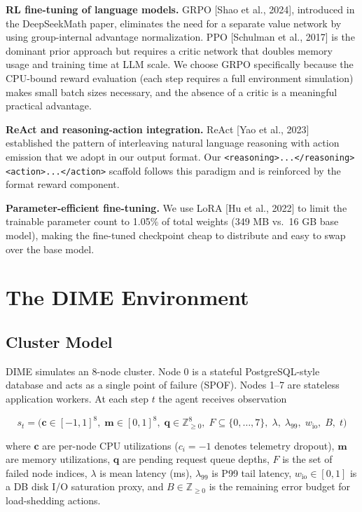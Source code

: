 \documentclass{article}
\begin{document}
\textbf{RL fine-tuning of language models.} GRPO [Shao et al., 2024], introduced in
the DeepSeekMath paper, eliminates the need for a separate value network by using
group-internal advantage normalization. PPO [Schulman et al., 2017] is the dominant
prior approach but requires a critic network that doubles memory usage and training time
at LLM scale. We choose GRPO specifically because the CPU-bound reward evaluation (each
step requires a full environment simulation) makes small batch sizes necessary, and the
absence of a critic is a meaningful practical advantage.

\textbf{ReAct and reasoning-action integration.} ReAct [Yao et al., 2023] established
the pattern of interleaving natural language reasoning with action emission that we adopt
in our output format. Our \texttt{<reasoning>...</reasoning><action>...</action>}
scaffold follows this paradigm and is reinforced by the format reward component.

\textbf{Parameter-efficient fine-tuning.} We use LoRA [Hu et al., 2022] to limit the
trainable parameter count to 1.05\% of total weights (349 MB vs.\ 16 GB base model),
making the fine-tuned checkpoint cheap to distribute and easy to swap over the base
model.

\section{The DIME Environment}

\subsection{Cluster Model}

DIME simulates an 8-node cluster. Node 0 is a stateful PostgreSQL-style database and
acts as a single point of failure (SPOF). Nodes 1--7 are stateless application workers.
At each step $t$ the agent receives observation

\[
s_t = \bigl(\mathbf{c} \in [-1,1]^8,\; \mathbf{m} \in [0,1]^8,\; \mathbf{q} \in \mathbb{Z}_{\geq 0}^8,\; F \subseteq \{0,\ldots,7\},\; \lambda,\; \lambda_{99},\; w_{\mathrm{io}},\; B,\; t\bigr)
\]

where $\mathbf{c}$ are per-node CPU utilizations ($c_i = -1$ denotes telemetry dropout),
$\mathbf{m}$ are memory utilizations, $\mathbf{q}$ are pending request queue depths,
$F$ is the set of failed node indices, $\lambda$ is mean latency (ms), $\lambda_{99}$
is P99 tail latency, $w_{\mathrm{io}} \in [0,1]$ is a DB disk I/O saturation proxy,
and $B \in \mathbb{Z}_{\geq 0}$ is the remaining error budget for load-shedding actions.
\end{document}

